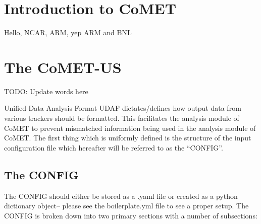 \documentclass[10pt,a4paper]{article}
\begin{document}
	\section{Introduction to CoMET}
	Hello, \ac{NCAR}, \ac{ARM}, yep \ac{ARM} \blindtext and \ac{BNL}
	
	\section{The CoMET-US}
	TODO: Update words here
	
	Unified Data Analysis Format UDAF dictates/defines how output data from various trackers should be formatted. This facilitates the analysis module of CoMET to prevent mismatched information being used in the analysis module of CoMET. The first thing which is uniformly defined is the structure of the input configuration file which hereafter will be referred to as the “CONFIG”.
	
	\subsection{The CONFIG}
	The CONFIG should either be stored as a .yaml file or created as a python dictionary object– please see the boilerplate.yml file to see a proper setup. The CONFIG is broken down into two primary sections with a number of subsections:
	
\end{document}
